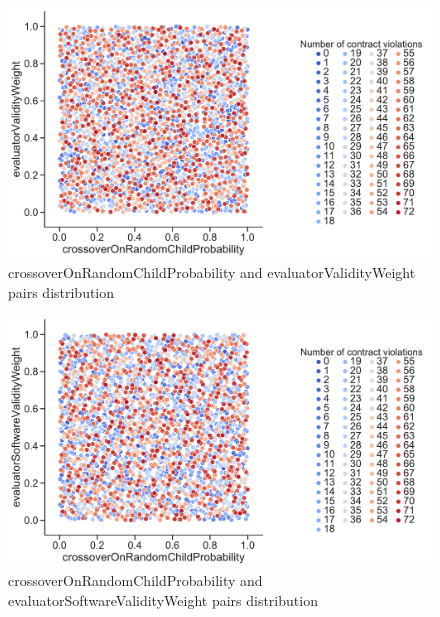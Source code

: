 \begin{figure}
	\centering
	\includegraphics[width=\textwidth]{images/PairsDistr/crossoverOnRandomChildProbability_evaluatorValidityWeight.pdf}
	\caption[crossoverOnRandomChildProbability and evaluatorValidityWeight pairs distribution]{crossoverOnRandomChildProbability and evaluatorValidityWeight pairs distribution}
	\label{fig:crossoverOnRandomChildProbability_evaluatorValidityWeight_pair}
\end{figure}
\begin{figure}
	\centering
	\includegraphics[width=\textwidth]{images/PairsDistr/crossoverOnRandomChildProbability_evaluatorSoftwareValidityWeight.pdf}
	\caption[crossoverOnRandomChildProbability and evaluatorSoftwareValidityWeight pairs distribution]{crossoverOnRandomChildProbability and evaluatorSoftwareValidityWeight pairs distribution} 
	\label{fig:crossoverOnRandomChildProbability_evaluatorSoftwareValidityWeight_pair}
\end{figure}
